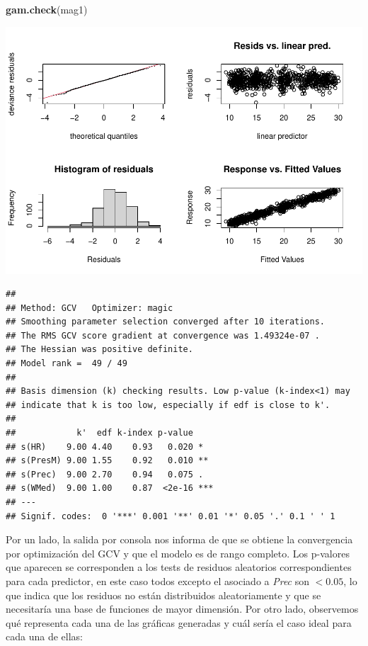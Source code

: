 \documentclass[12pt,a4paper,]{book}
\newenvironment{Shaded}{\begin{snugshade}}{\end{snugshade}}
\newcommand{\FunctionTok}[1]{\textcolor[rgb]{0.13,0.29,0.53}{\textbf{#1}}}
\newcommand{\NormalTok}[1]{#1}
\numberwithin{dummy}{section}
\theoremstyle{ocrenumbox}
\theoremstyle{blacknumex}
\theoremstyle{blacknumbox}
\theoremstyle{ocrenum}
\theoremstyle{ocrenum}
\begin{document}
\begin{Shaded}
\begin{Highlighting}[]
\FunctionTok{gam.check}\NormalTok{(mag1)}
\end{Highlighting}
\end{Shaded}

\begin{center}\includegraphics[width=0.95\linewidth]{figurasR/unnamed-chunk-12-1} \end{center}

\begin{verbatim}
## 
## Method: GCV   Optimizer: magic
## Smoothing parameter selection converged after 10 iterations.
## The RMS GCV score gradient at convergence was 1.49324e-07 .
## The Hessian was positive definite.
## Model rank =  49 / 49 
## 
## Basis dimension (k) checking results. Low p-value (k-index<1) may
## indicate that k is too low, especially if edf is close to k'.
## 
##            k'  edf k-index p-value    
## s(HR)    9.00 4.40    0.93   0.020 *  
## s(PresM) 9.00 1.55    0.92   0.010 ** 
## s(Prec)  9.00 2.70    0.94   0.075 .  
## s(WMed)  9.00 1.00    0.87  <2e-16 ***
## ---
## Signif. codes:  0 '***' 0.001 '**' 0.01 '*' 0.05 '.' 0.1 ' ' 1
\end{verbatim}

Por un lado, la salida por consola nos informa de que se obtiene la
convergencia por optimización del GCV y que el modelo es de rango
completo. Los p-valores que aparecen se corresponden a los tests de
residuos aleatorios correspondientes para cada predictor, en este caso
todos excepto el asociado a \emph{Prec} son \(<0.05\), lo que indica que
los residuos no están distribuidos aleatoriamente y que se necesitaría
una base de funciones de mayor dimensión. Por otro lado, observemos qué
representa cada una de las gráficas generadas y cuál sería el caso ideal
para cada una de ellas:
\end{document}
